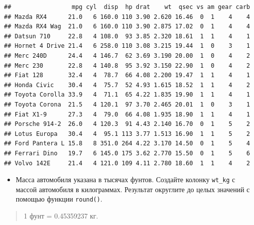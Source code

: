\documentclass[]{book}
\providecommand{\tightlist}{%
  \setlength{\itemsep}{0pt}\setlength{\parskip}{0pt}}
\begin{document}
\begin{verbatim}
##                 mpg cyl  disp  hp drat    wt  qsec vs am gear carb
## Mazda RX4      21.0   6 160.0 110 3.90 2.620 16.46  0  1    4    4
## Mazda RX4 Wag  21.0   6 160.0 110 3.90 2.875 17.02  0  1    4    4
## Datsun 710     22.8   4 108.0  93 3.85 2.320 18.61  1  1    4    1
## Hornet 4 Drive 21.4   6 258.0 110 3.08 3.215 19.44  1  0    3    1
## Merc 240D      24.4   4 146.7  62 3.69 3.190 20.00  1  0    4    2
## Merc 230       22.8   4 140.8  95 3.92 3.150 22.90  1  0    4    2
## Fiat 128       32.4   4  78.7  66 4.08 2.200 19.47  1  1    4    1
## Honda Civic    30.4   4  75.7  52 4.93 1.615 18.52  1  1    4    2
## Toyota Corolla 33.9   4  71.1  65 4.22 1.835 19.90  1  1    4    1
## Toyota Corona  21.5   4 120.1  97 3.70 2.465 20.01  1  0    3    1
## Fiat X1-9      27.3   4  79.0  66 4.08 1.935 18.90  1  1    4    1
## Porsche 914-2  26.0   4 120.3  91 4.43 2.140 16.70  0  1    5    2
## Lotus Europa   30.4   4  95.1 113 3.77 1.513 16.90  1  1    5    2
## Ford Pantera L 15.8   8 351.0 264 4.22 3.170 14.50  0  1    5    4
## Ferrari Dino   19.7   6 145.0 175 3.62 2.770 15.50  0  1    5    6
## Volvo 142E     21.4   4 121.0 109 4.11 2.780 18.60  1  1    4    2
\end{verbatim}

\begin{itemize}
\tightlist
\item
  Масса автомобиля указана в тысячах фунтов. Создайте колонку
  \texttt{wt\_kg} с массой автомобиля в килограммах. Результат округлите
  до целых значений с помощью функции \texttt{round()}.
\end{itemize}

\begin{quote}
1 фунт = 0.45359237 кг.
\end{quote}
\end{document}
